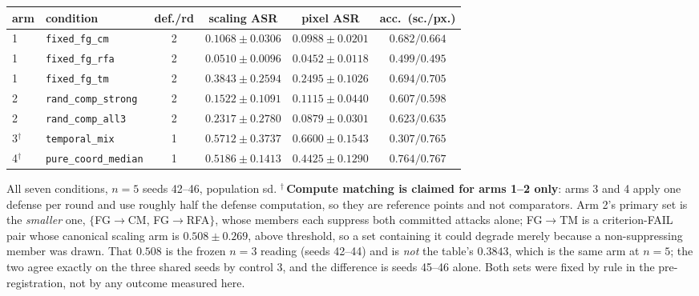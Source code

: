 \documentclass{article}
\begin{document}
\begin{center}\small
\begin{tabular}{llcccc}
\toprule
arm & condition & def./rd & scaling ASR & pixel ASR & acc.\ (sc./px.) \\
\midrule
1 & \texttt{fixed\_fg\_cm} & 2 & $0.1068 \pm 0.0306$ & $0.0988 \pm 0.0201$ & $0.682/0.664$ \\
1 & \texttt{fixed\_fg\_rfa} & 2 & $0.0510 \pm 0.0096$ & $0.0452 \pm 0.0118$ & $0.499/0.495$ \\
1 & \texttt{fixed\_fg\_tm} & 2 & $0.3843 \pm 0.2594$ & $0.2495 \pm 0.1026$ & $0.694/0.705$ \\
2 & \texttt{rand\_comp\_strong} & 2 & $\mathbf{0.1522 \pm 0.1091}$ & $\mathbf{0.1115 \pm 0.0440}$ & $0.607/0.598$ \\
2 & \texttt{rand\_comp\_all3} & 2 & $0.2317 \pm 0.2780$ & $0.0879 \pm 0.0301$ & $0.623/0.635$ \\
3$^{\dagger}$ & \texttt{temporal\_mix} & 1 & $0.5712 \pm 0.3737$ & $0.6600 \pm 0.1543$ & $\mathbf{0.307}/0.765$ \\
4$^{\dagger}$ & \texttt{pure\_coord\_median} & 1 & $0.5186 \pm 0.1413$ & $0.4425 \pm 0.1290$ & $0.764/0.767$ \\
\bottomrule
\end{tabular}
\end{center}

\noindent All seven conditions, $n=5$ seeds 42--46, population sd. $^{\dagger}$\,\textbf{Compute matching
is claimed for arms 1--2 only}: arms 3 and 4 apply one defense per round and use roughly half the defense
computation, so they are reference points and not comparators. Arm 2's primary set is the \emph{smaller}
one, $\{$FG$\to$CM, FG$\to$RFA$\}$, whose members each suppress both committed attacks alone; FG$\to$TM
is a criterion-FAIL pair whose canonical scaling arm is $0.508 \pm 0.269$, above threshold, so a set
containing it could degrade merely because a non-suppressing member was drawn. That $0.508$ is the frozen
$n{=}3$ reading (seeds 42--44) and is \emph{not} the table's $0.3843$, which is the same arm at $n{=}5$;
the two agree exactly on the three shared seeds by control 3, and the difference is seeds 45--46 alone. Both sets were fixed by
rule in the pre-registration, not by any outcome measured here.
\end{document}
